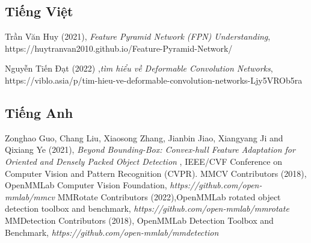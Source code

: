 \documentclass[12pt,a4paper,openany,oneside]{report}
\begin{document}
\begin{thebibliography}{30}
	
\subsection*{Tiếng Việt}

 Trần Văn Huy (2021), \textit{Feature Pyramid Network (FPN) Understanding}, https://huytranvan2010.github.io/Feature-Pyramid-Network/

 Nguyễn Tiến Đạt (2022) ,\textit{tìm hiểu về Deformable Convolution Networks}, https://viblo.asia/p/tim-hieu-ve-deformable-convolution-networks-Ljy5VROb5ra
\subsection*{Tiếng Anh}

	 Zonghao Guo, Chang Liu, Xiaosong Zhang, Jianbin Jiao, Xiangyang Ji and Qixiang Ye (2021), \textit{Beyond Bounding-Box: Convex-hull Feature Adaptation for Oriented and Densely Packed Object Detection} , IEEE/CVF Conference on Computer Vision and Pattern Recognition (CVPR).
	 MMCV Contributors (2018), OpenMMLab Computer Vision Foundation, \textit{https://github.com/open-mmlab/mmcv}
	 MMRotate Contributors (2022),OpenMMLab rotated object detection toolbox and benchmark, \textit{https://github.com/open-mmlab/mmrotate}
	 MMDetection Contributors (2018), OpenMMLab Detection Toolbox and Benchmark, \textit{https://github.com/open-mmlab/mmdetection}
\end{thebibliography} 
\end{document}
